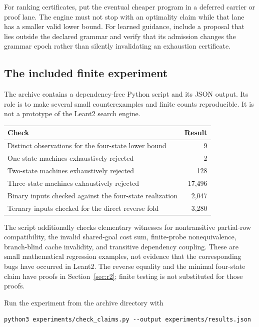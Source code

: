\documentclass[11pt,a4paper]{article}
\theoremstyle{remark}
\begin{document}
For ranking certificates, put the eventual cheaper program in a deferred
carrier or proof lane. The engine must not stop with an optimality claim
while that lane has a smaller valid lower bound. For learned guidance,
include a proposal that lies outside the declared grammar and verify that
its admission changes the grammar epoch rather than silently invalidating
an exhaustion certificate.

\subsection{The included finite experiment}

The archive contains a dependency-free Python script and its JSON output.
Its role is to make several small counterexamples and finite counts
reproducible. It is not a prototype of the Leant2 search engine.

\begin{center}
\begin{tabular}{@{}L{91mm}r@{}}
\toprule
Check & Result\\
\midrule
Distinct observations for the four-state lower bound & 9\\
One-state machines exhaustively rejected & 2\\
Two-state machines exhaustively rejected & 128\\
Three-state machines exhaustively rejected & 17,496\\
Binary inputs checked against the four-state realization & 2,047\\
Ternary inputs checked for the direct reverse fold & 3,280\\
\bottomrule
\end{tabular}
\end{center}

The script additionally checks elementary witnesses for nontransitive partial-row
compatibility, the invalid shared-goal cost sum, finite-probe nonequivalence,
branch-blind cache invalidity, and transitive dependency coupling. These are
small mathematical regression examples, not evidence that the corresponding
bugs have occurred in Leant2. The reverse equality and the minimal four-state
claim have proofs in Section~\ref{sec:r2}; finite testing is not substituted
for those proofs.

Run the experiment from the archive directory with
\begin{lstlisting}
python3 experiments/check_claims.py --output experiments/results.json
\end{lstlisting}
\end{document}
